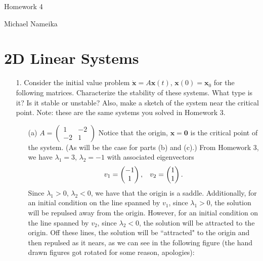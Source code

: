 \documentclass{article}
\begin{document}
\begin{center}
    {\Huge Homework 4}
    \vspace{0.5 cm}

    {\large Michael Nameika}
\end{center}


\section*{2D Linear Systems}
\begin{itemize}
    \item[1.] Consider the initial value problem $\dot{\mathbf{x}} = A\mathbf{x}(t)$, $\mathbf{x}(0) = \mathbf{x}_0$ for the following matrices. Characterize the stability of these systems. What type is it? Is it stable or unstable? Also, make a sketch of the system near the critical point. Note: these are the same systems you solved in Homework 3.
    \begin{itemize}
        \item[(a)] $A = \begin{pmatrix}
            1 & -2\\
            -2 & 1
        \end{pmatrix}$
        \newline\newline
        Notice that the origin, $\mathbf{x} = \mathbf{0}$ is the critical point of the system. (As will be the case for parts (b) and (c).) From Homework 3, we have $\lambda_1 = 3$, $\lambda_2 = -1$ with associated eigenvectors
        \[v_1 = \begin{pmatrix}
            -1\\
            1
        \end{pmatrix}, \hspace{0.3cm} v_2 = \begin{pmatrix}
            1\\
            1
        \end{pmatrix}.\]
        Since $\lambda_1 > 0$, $\lambda_2 < 0$, we have that the origin is a saddle. 
        \newline
        Additionally, for an initial condition on the line spanned by $v_1$, since $\lambda_1 > 0$, the solution will be repulsed away from the origin. However, for an initial condition on the line spanned by $v_2$, since $\lambda_2 < 0$, the solution will be attracted to the origin. Off these lines, the solution will be ``attracted" to the origin and then repulsed as it nears, as we can see in the following figure (the hand drawn figures got rotated for some reason, apologies):

\end{itemize}
\end{itemize}
\end{document}
